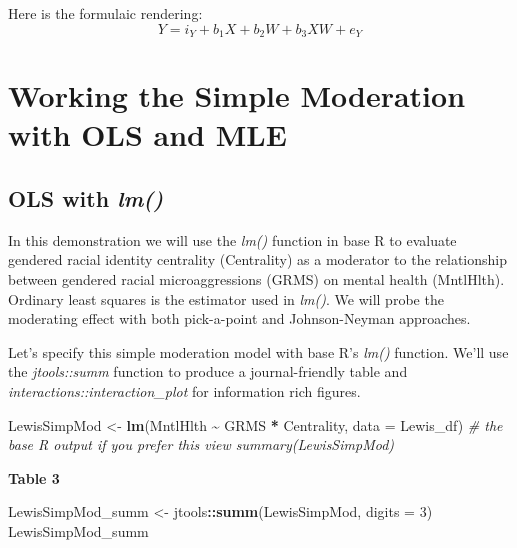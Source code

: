 \documentclass[
  11pt,
]{book}
\newenvironment{Shaded}{\begin{snugshade}}{\end{snugshade}}
\newcommand{\AttributeTok}[1]{\textcolor[rgb]{0.27,0.27,0.27}{#1}}
\newcommand{\CommentTok}[1]{\textcolor[rgb]{0.37,0.37,0.37}{\textit{#1}}}
\newcommand{\DecValTok}[1]{\textcolor[rgb]{0.06,0.06,0.06}{#1}}
\newcommand{\FunctionTok}[1]{\textcolor[rgb]{0.27,0.27,0.27}{\textbf{#1}}}
\newcommand{\NormalTok}[1]{#1}
\newcommand{\OtherTok}[1]{\textcolor[rgb]{0.37,0.37,0.37}{#1}}
\newcommand{\SpecialCharTok}[1]{\textcolor[rgb]{0.43,0.43,0.43}{\textbf{#1}}}
\begin{document}
Here is the formulaic rendering: \[Y = i_{Y}+ b_{1}X+ b_{2}W + b_{3}XW +e_{Y}\]

\hypertarget{working-the-simple-moderation-with-ols-and-mle}{%
\section{Working the Simple Moderation with OLS and MLE}\label{working-the-simple-moderation-with-ols-and-mle}}

\hypertarget{ols-with-lm}{%
\subsection{\texorpdfstring{OLS with \emph{lm()}}{OLS with lm()}}\label{ols-with-lm}}

In this demonstration we will use the \emph{lm()} function in base R to evaluate gendered racial identity centrality (Centrality) as a moderator to the relationship between gendered racial microaggressions (GRMS) on mental health (MntlHlth). Ordinary least squares is the estimator used in \emph{lm()}. We will probe the moderating effect with both pick-a-point and Johnson-Neyman approaches.

Let's specify this simple moderation model with base R's \emph{lm()} function. We'll use the \emph{jtools::summ} function to produce a journal-friendly table and \emph{interactions::interaction\_plot} for information rich figures.

\begin{Shaded}
\begin{Highlighting}[]
\NormalTok{LewisSimpMod }\OtherTok{\textless{}{-}} \FunctionTok{lm}\NormalTok{(MntlHlth }\SpecialCharTok{\textasciitilde{}}\NormalTok{ GRMS }\SpecialCharTok{*}\NormalTok{ Centrality, }\AttributeTok{data =}\NormalTok{ Lewis\_df)}
\CommentTok{\# the base R output if you prefer this view summary(LewisSimpMod)}
\end{Highlighting}
\end{Shaded}

\textbf{Table 3}

\begin{Shaded}
\begin{Highlighting}[]
\NormalTok{LewisSimpMod\_summ }\OtherTok{\textless{}{-}}\NormalTok{ jtools}\SpecialCharTok{::}\FunctionTok{summ}\NormalTok{(LewisSimpMod, }\AttributeTok{digits =} \DecValTok{3}\NormalTok{)}
\NormalTok{LewisSimpMod\_summ}
\end{Highlighting}
\end{Shaded}
\end{document}

